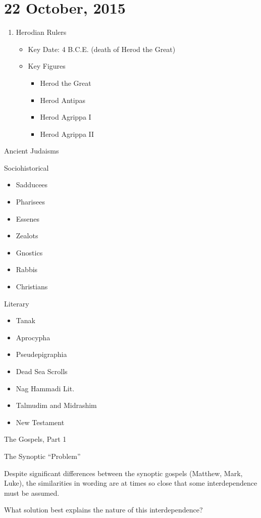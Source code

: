 \documentclass{article}
\begin{document}
    \section{22 October, 2015}

    \begin{enumerate}
        \item Herodian Rulers \\
            \begin{itemize}
                \item Key Date: 4 B.C.E. (death of Herod the Great)
                \item Key Figures \\
                    \begin{itemize}
                        \item Herod the Great
                        \item Herod Antipas
                        \item Herod Agrippa I
                        \item Herod Agrippa II
                    \end{itemize}
            \end{itemize}
    \end{enumerate}

    \centerline{Ancient Judaisms}

    Sociohistorical

    \begin{itemize}
        \item Sadducees
        \item Pharisees
        \item Essenes
        \item Zealots
        \item Gnostics
        \item Rabbis
        \item Christians
    \end{itemize}

    Literary

    \begin{itemize}
        \item Tanak
        \item Aprocypha
        \item Pseudepigraphia
        \item Dead Sea Scrolls
        \item Nag Hammadi Lit.
        \item Talmudim and Midrashim
        \item New Testament
    \end{itemize}

    \centerline{The Gospels, Part 1}

    The Synoptic ``Problem''

    Despite significant differences between the synoptic gospels (Matthew, Mark, Luke), the similarities in wording are at times so close that some interdependence must be assumed.

    What solution best explains the nature of this interdependence?
\end{document}
